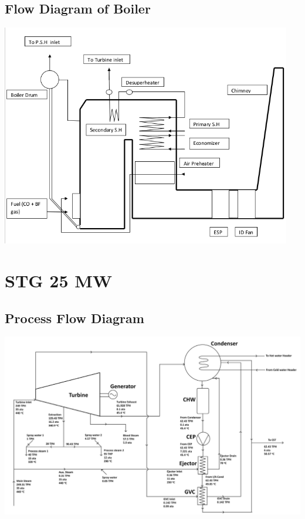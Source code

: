 \documentclass[english,11pt]{report}
\begin{document}
\section{Flow Diagram of Boiler}
\begin{center}
\includegraphics[width =5in]{flow}
\end{center}
    


\chapter{STG 25 MW}
\section{Process Flow Diagram}
\includegraphics[width =6in]{stgprocessflow.png}
\end{document}
